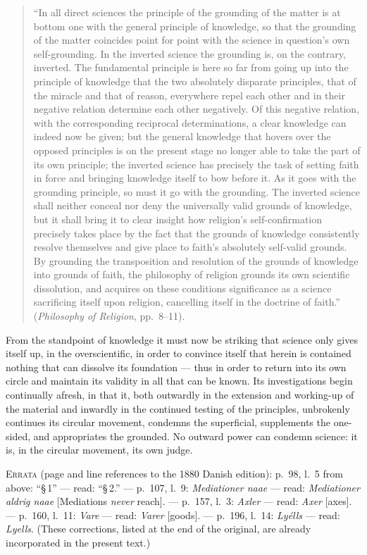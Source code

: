 \documentclass[12pt]{book}
\begin{document}
\begin{quote}
``In all direct sciences the principle of the grounding of the matter is at bottom one with the
general principle of knowledge, so that the grounding of the matter coincides point for point with
the science in question's own self-grounding. In the inverted science the grounding is, on the
contrary, inverted. The fundamental principle is here so far from going up into the principle of
knowledge that the two absolutely disparate principles, that of the miracle and that of reason,
everywhere repel each other and in their negative relation determine each other negatively. Of
this negative relation, with the corresponding reciprocal determinations, a clear knowledge can
indeed now be given; but the general knowledge that hovers over the opposed principles is on the
present stage no longer able to take the part of its own principle; the inverted science has
precisely the task of setting faith in force and bringing knowledge itself to bow before it. As it
goes with the grounding principle, so must it go with the grounding. The inverted science shall
neither conceal nor deny the universally valid grounds of knowledge, but it shall bring it to
clear insight how religion's self-confirmation precisely takes place by the fact that the grounds
of knowledge consistently resolve themselves and give place to faith's absolutely self-valid
grounds. By grounding the transposition and resolution of the grounds of knowledge into grounds of
faith, the philosophy of religion grounds its own scientific dissolution, and acquires on these
conditions significance as a science sacrificing itself upon religion, cancelling itself in the
doctrine of faith.'' (\textit{Philosophy of Religion}, pp.\ 8--11).
\end{quote}

From the standpoint of knowledge it must now be striking that science only gives itself up, in the
overscientific, in order to convince itself that herein is contained nothing that can dissolve its
foundation --- thus in order to return into its own circle and maintain its validity in all that
can be known. Its investigations begin continually afresh, in that it, both outwardly in the
extension and working-up of the material and inwardly in the continued testing of the principles,
unbrokenly continues its circular movement, condemns the superficial, supplements the one-sided,
and appropriates the grounded. No outward power can condemn science: it is, in the circular
movement, its own judge.

\bigskip

{\footnotesize\noindent\textsc{Errata} (page and line references to the 1880 Danish edition):
p.\ 98, l.\ 5 from above: ``\S\,1'' --- read: ``\S\,2.'' --- p.\ 107, l.\ 9: \textit{Mediationer
naae} --- read: \textit{Mediationer aldrig naae} [Mediations \emph{never} reach]. --- p.\ 157,
l.\ 3: \textit{Axler} --- read: \textit{Axer} [axes]. --- p.\ 160, l.\ 11: \textit{Vare} --- read:
\textit{Varer} [goods]. --- p.\ 196, l.\ 14: \textit{Lyélls} --- read: \textit{Lyells}. (These
corrections, listed at the end of the original, are already incorporated in the present text.)}
\end{document}
